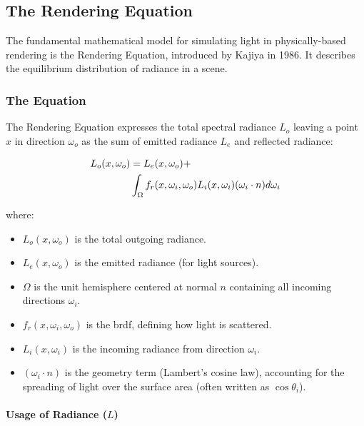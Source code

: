 
\subsection{The Rendering Equation}\label{subsec:rendering-equation}

The fundamental mathematical model for simulating light in physically-based rendering is the Rendering Equation,
introduced by Kajiya in 1986\cite{10.1145/15886.15902}.
It describes the equilibrium distribution of radiance in a scene.

\subsubsection{The Equation}\label{subsubsec:the-equation}

The Rendering Equation expresses the total spectral radiance $L_o$
leaving a point $x$ in direction $\omega_o$ as the sum
of emitted radiance $L_e$ and reflected radiance:

\begin{align}
    L_o(x, \omega_o) &= L_e(x, \omega_o) + \notag \\
    & \int_{\Omega} f_r(x, \omega_i, \omega_o) L_i(x, \omega_i) (\omega_i \cdot n) d\omega_i
    \label{eq:rendering-equation}
\end{align}

where:
\begin{itemize}
    \item $L_o(x, \omega_o)$ is the total outgoing radiance.
    \item $L_e(x, \omega_o)$ is the emitted radiance (for light sources).
    \item $\Omega$ is the unit hemisphere centered at normal $n$ containing all incoming directions $\omega_i$.
    \item $f_r(x, \omega_i, \omega_o)$ is the \gls{brdf}, defining how light is scattered.
    \item $L_i(x, \omega_i)$ is the incoming radiance from direction $\omega_i$.
    \item $(\omega_i \cdot n)$ is the geometry term (Lambert's cosine law),
        accounting for the spreading of light over the surface area (often written as $\cos\theta_i$).
\end{itemize}

\paragraph{Usage of Radiance ($L$)}

